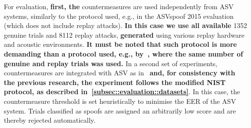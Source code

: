 For evaluation, {\bfseries first, the} countermeasures are used independently from ASV systems, similarly to the protocol used, e.g., in the ASVspoof 2015 evaluation~\cite{Wu2015} (which does not include replay attacks).  {\bfseries In this case we use all available} 1352 genuine trials and 8112 replay attacks, {\bfseries generated} using various replay hardware and acoustic environments. {\bfseries It must be noted that such protocol is more demanding than a protocol used, e.g., by~\cite{Luo2015}, where the same number of genuine and replay trials was used.} 
In a second set of experiments, countermeasures are integrated with ASV as in~\cite{Alegre2013a} {\bfseries and, for consistency with the previous research, the experiment follows the modified NIST protocol, as described in~\ref{subsec::evaluation::datasets}}. In this case, the countermeasure threshold is set heuristically to minimise the EER of the ASV system. Trials classified as spoofs are assigned an arbitrarily low score and are thereby rejected automatically.
